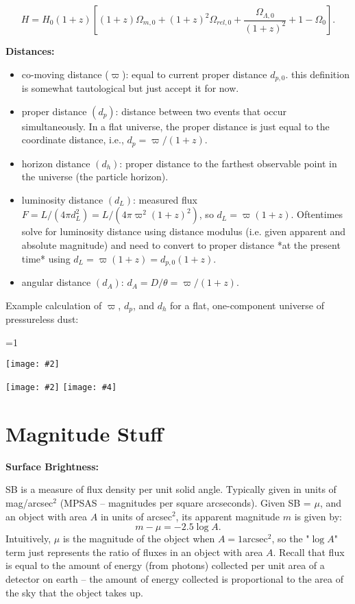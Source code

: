 \documentclass[11pt]{article}
\newcommand{\V}{

\vspace{\baselineskip}

}
\newcommand{\image}[5][1]{
\ifnum #1=1 
    \begin{center}
        \texttt{[image: \#2]}
    \end{center}
\else
    \begin{center}
        \texttt{[image: \#2]}
        \texttt{[image: \#4]}
    \end{center}
\fi
}
\begin{document}
\[H = H_{0}(1+z)\left[(1+z)\Omega_{m,0} + (1+z)^{2}\Omega_{rel,0} + \frac{\Omega_{\Lambda,0}}{(1+z)^{2}} + 1-\Omega_{0}\right].\]\V

\textbf{Distances:}

\begin{itemize}
\item co-moving distance ($\varpi$): equal to current proper distance $d_{p,0}$. this definition is somewhat tautological but just accept it for now.
\item proper distance $(d_{p})$: distance between two events that occur simultaneously. In a flat universe, the proper distance is just equal to the coordinate distance, i.e., $d_{p} = \varpi/(1+z)$.
\item horizon distance $(d_{h})$: proper distance to the farthest observable point in the universe (the particle horizon).
\item luminosity distance $(d_{L})$: measured flux $F = L/(4\pi d_{L}^{2}) = L/(4\pi \varpi^{2} (1+z)^{2})$, so $d_{L} = \varpi (1+z)$. Oftentimes solve for luminosity distance using distance modulus (i.e. given apparent and absolute magnitude) and need to convert to proper distance *at the present time* using $d_L = \varpi (1+z) = d_{p,0} (1+z)$. 
\item angular distance $(d_{A})$: $d_{A} = D/\theta = \varpi/(1+z)$.
\end{itemize}

Example calculation of $\varpi$, $d_{p}$, and $d_{h}$ for a flat, one-component universe of pressureless dust: 

\image[2]{images/varpi-1.png}{6}{images/varpi-2.png}{6}

\section{Magnitude Stuff}

\textbf{Surface Brightness:}

SB is a measure of flux density per unit solid angle. Typically given in units of mag/arcsec$^2$ (MPSAS -- magnitudes per square arcseconds). Given SB = $\mu$, and an object with area $A$ in units of arcsec$^2$, its apparent magnitude $m$ is given by:
\[m - \mu = -2.5\log{A}.\]
Intuitively, $\mu$ is the magnitude of the object when $A = 1\text{arcsec}^2$, so the "$\log{A}$" term just represents the ratio of fluxes in an object with area $A$. Recall that flux is equal to the amount of energy (from photons) collected per unit area of a detector on earth -- the amount of energy collected is proportional to the area of the sky that the object takes up.
\end{document}
